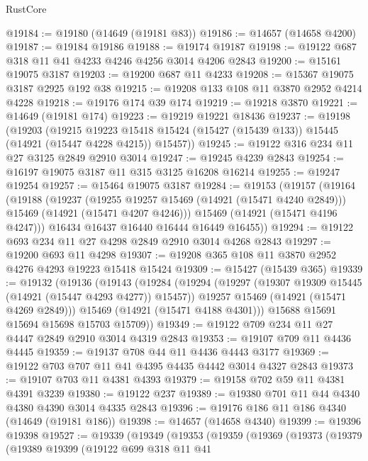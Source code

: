 \begin{lexlean}{RustCore}
\begin{coremodule}
@19184 := @19180 (@14649 (@19181 @83))
@19186 := @14657 (@14658 @4200)
@19187 := @19184 @19186
@19188 := @19174 @19187
@19198 := @19122 @687 @318 @11 @41 @4233 @4246 @4256 @3014 @4206 @2843
@19200 := @15161 @19075 @3187
@19203 := @19200 @687 @11 @4233
@19208 := @15367 @19075 @3187 @2925 @192 @38
@19215 := @19208 @133 @108 @11 @3870 @2952 @4214 @4228
@19218 := @19176 @174 @39 @174
@19219 := @19218 @3870
@19221 := @14649 (@19181 @174)
@19223 := @19219 @19221 @18436
@19237 := @19198
    (@19203
      (@19215
        @19223
        @15418
        @15424
        (@15427 (@15439 @133))
        @15445
        (@14921 (@15447 @4228 @4215))
        @15457))
@19245 := @19122 @316 @234 @11 @27 @3125 @2849 @2910 @3014
@19247 := @19245 @4239 @2843
@19254 := @16197 @19075 @3187 @11 @315 @3125 @16208 @16214
@19255 := @19247 @19254
@19257 := @15464 @19075 @3187
@19284 := @19153
    (@19157
      (@19164
        (@19188
          (@19237
            (@19255 @19257 @15469 (@14921 (@15471 @4240 @2849)))
            @15469
            (@14921 (@15471 @4207 @4246)))
          @15469
          (@14921 (@15471 @4196 @4247)))
        @16434
        @16437
        @16440
        @16444
        @16449
        @16455))
@19294 := @19122 @693 @234 @11 @27 @4298 @2849 @2910 @3014 @4268 @2843
@19297 := @19200 @693 @11 @4298
@19307 := @19208 @365 @108 @11 @3870 @2952 @4276 @4293 @19223 @15418 @15424
@19309 := @15427 (@15439 @365)
@19339 := @19132
    (@19136
      (@19143
        (@19284
          (@19294
            (@19297 (@19307 @19309 @15445 (@14921 (@15447 @4293 @4277)) @15457))
            @19257
            @15469
            (@14921 (@15471 @4269 @2849)))
          @15469
          (@14921 (@15471 @4188 @4301)))
        @15688
        @15691
        @15694
        @15698
        @15703
        @15709))
@19349 := @19122 @709 @234 @11 @27 @4447 @2849 @2910 @3014 @4319 @2843
@19353 := @19107 @709 @11 @4436 @4445
@19359 := @19137 @708 @44 @11 @4436 @4443 @3177
@19369 := @19122 @703 @707 @11 @41 @4395 @4435 @4442 @3014 @4327 @2843
@19373 := @19107 @703 @11 @4381 @4393
@19379 := @19158 @702 @59 @11 @4381 @4391 @3239
@19380 := @19122 @237
@19389 := @19380 @701 @11 @44 @4340 @4380 @4390 @3014 @4335 @2843
@19396 := @19176 @186 @11 @186 @4340 (@14649 (@19181 @186))
@19398 := @14657 (@14658 @4340)
@19399 := @19396 @19398
@19527 := @19339
    (@19349
      (@19353
        (@19359
          (@19369
            (@19373
              (@19379
                (@19389
                  @19399
                  (@19122
                    @699
                    @318
                    @11
                    @41

\end{coremodule}
\end{lexlean}
